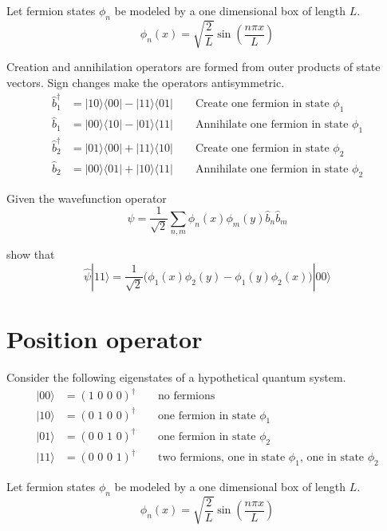 \documentclass[12pt]{article}
\begin{document}
\noindent
Let fermion states $\phi_n$ be modeled by a one dimensional box of length $L$.
\begin{equation*}
\phi_n(x)=\sqrt{\frac{2}{L}}\sin\left(\frac{n\pi x}{L}\right)
\end{equation*}

\noindent
Creation and annihilation operators are formed from outer products of state vectors.
Sign changes make the operators antisymmetric.
\begin{align*}
\hat{b}_1^\dag&=|10\rangle\langle00|-|11\rangle\langle01| \qquad\text{Create one fermion in state $\phi_1$}
\\
\hat{b}_1&=|00\rangle\langle10|-|01\rangle\langle11| \qquad\text{Annihilate one fermion in state $\phi_1$}
\\
\hat{b}_2^\dag&=|01\rangle\langle00|+|11\rangle\langle10| \qquad\text{Create one fermion in state $\phi_2$}
\\
\hat{b}_2&=|00\rangle\langle01|+|10\rangle\langle11| \qquad\text{Annihilate one fermion in state $\phi_2$}
\end{align*}

\noindent
Given the wavefunction operator
\begin{equation*}
\hat{\psi}=\frac{1}{\sqrt{2}}\sum_{n,m}\phi_n(x)\phi_m(y)\hat{b}_n\hat{b}_m
\end{equation*}

\noindent
show that
\begin{equation*}
\hat{\psi}|11\rangle=\frac{1}{\sqrt{2}}\big(\phi_1(x)\phi_2(y)-\phi_1(y)\phi_2(x)\big)|00\rangle
\end{equation*}

\newpage

\section{Position operator}
Consider the following eigenstates of a hypothetical quantum system.
\begin{align*}
|00\rangle&=(\text{1 0 0 0})^\dag\qquad\text{no fermions}\\
|10\rangle&=(\text{0 1 0 0})^\dag\qquad\text{one fermion in state $\phi_1$}\\
|01\rangle&=(\text{0 0 1 0})^\dag\qquad\text{one fermion in state $\phi_2$}\\
|11\rangle&=(\text{0 0 0 1})^\dag\qquad\text{two fermions, one in state $\phi_1$, one in state $\phi_2$}
\end{align*}

\noindent
Let fermion states $\phi_n$ be modeled by a one dimensional box of length $L$.
\begin{equation*}
\phi_n(x)=\sqrt{\frac{2}{L}}\sin\left(\frac{n\pi x}{L}\right)
\end{equation*}
\end{document}
